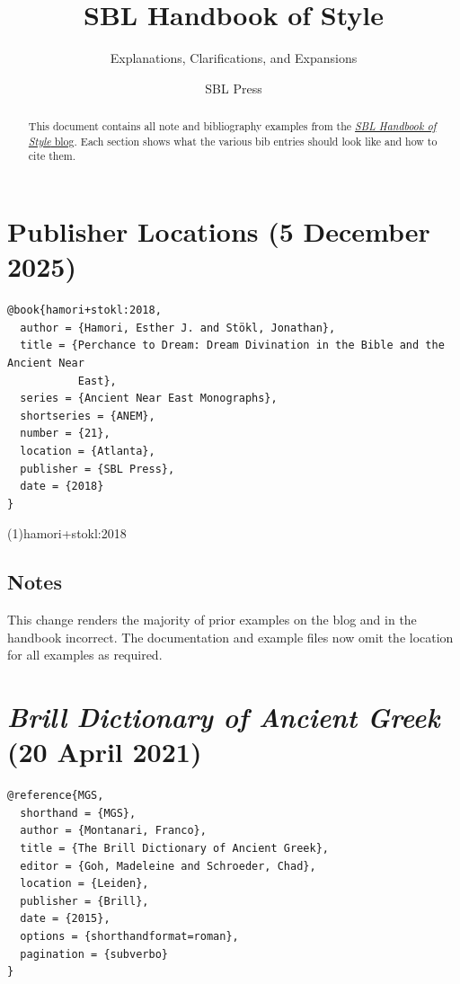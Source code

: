 \documentclass[a4paper]{article}
\begin{document}
\title{SBL Handbook of Style}
\author{Explanations, Clarifications, and Expansions}
\date{SBL Press}
\maketitle

\begin{abstract}
  This document contains all note and bibliography examples from the
  \href{https://sblhs2.com/}{\emph{SBL Handbook of Style} blog}. Each section
  shows what the various bib entries should look like and how to cite them.
\end{abstract}

\tableofcontents

\section{Publisher Locations (5 December 2025)}

\begin{verbatim}
@book{hamori+stokl:2018,
  author = {Hamori, Esther J. and Stökl, Jonathan},
  title = {Perchance to Dream: Dream Divination in the Bible and the Ancient Near
           East},
  series = {Ancient Near East Monographs},
  shortseries = {ANEM},
  number = {21},
  location = {Atlanta},
  publisher = {SBL Press},
  date = {2018}
}
\end{verbatim}

\examplecite(1){hamori+stokl:2018}
\exampleabbreviations
\examplebibliography
{}

\subsection{Notes}

This change renders the majority of prior examples on the blog and in the
handbook incorrect. The  documentation and example files
now omit the location for all examples as required.

\section{\emph{Brill Dictionary of Ancient Greek} (20 April 2021)}

\begin{verbatim}
@reference{MGS,
  shorthand = {MGS},
  author = {Montanari, Franco},
  title = {The Brill Dictionary of Ancient Greek},
  editor = {Goh, Madeleine and Schroeder, Chad},
  location = {Leiden},
  publisher = {Brill},
  date = {2015},
  options = {shorthandformat=roman},
  pagination = {subverbo}
}
\end{verbatim}
\end{document}
